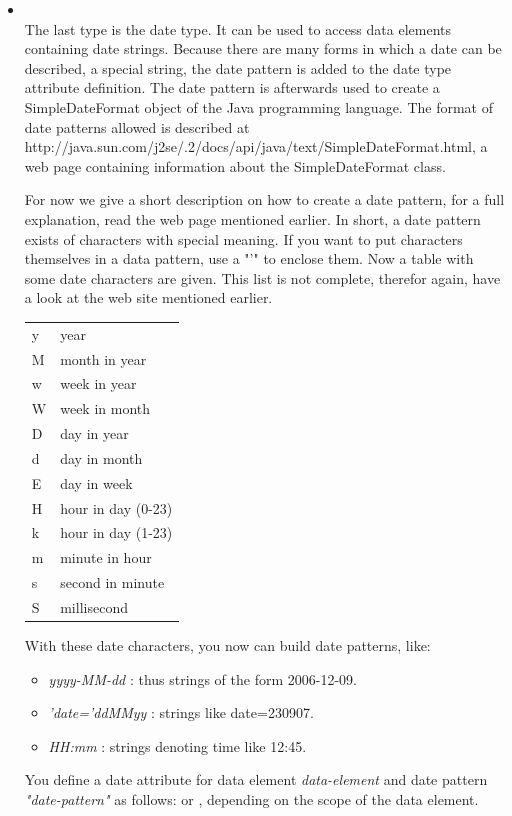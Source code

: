 \begin{itemize}
    \item {}\\
    The last type is the date type. It can be used to access data
    elements containing date strings. Because there are many forms in which a
    date can be described, a special string, the date pattern is added to the
    date type attribute definition. The date pattern is afterwards used
    to create a SimpleDateFormat object of the Java
    programming language. The format of date patterns allowed is described at
    http://\-java.sun.com/\-j2se/.2/\-docs/\-api/\-java/\-text/\-SimpleDateFormat.html,
    a web page containing information about the SimpleDateFormat class.

    For now we give a short description on how to create a date pattern, for a
    full explanation, read the web page mentioned earlier. In short, a date
    pattern exists of characters with special meaning. If you want to put
    characters themselves in a data pattern, use a "'" to enclose them. Now a
    table with some date characters are given. This list is not complete,
    therefor again, have a look at the web site mentioned earlier.

    \begin{tabular}{ll}
	y & year\\
	M & month in year\\
	w & week in year\\
	W & week in month\\
	D & day in year\\
	d & day in month\\
	E & day in week\\
	H & hour in day (0-23)\\
	k & hour in day (1-23)\\
	m & minute in hour\\
	s & second in minute\\
	S & millisecond\\
    \end{tabular}

    With these date characters, you now can build date patterns, like:
    \begin{itemize}
	\item \textit{yyyy-MM-dd} : thus strings of the form 2006-12-09.
	\item \textit{'date='ddMMyy} : strings like date=230907.
	\item \textit{HH:mm} : strings denoting time like 12:45.
    \end{itemize}

    You define a date attribute for data element \textit{data-element} and
    date pattern \textit{"date-pattern"} as
    follows:  or ,
    depending on the scope of the data element.
\end{itemize}

